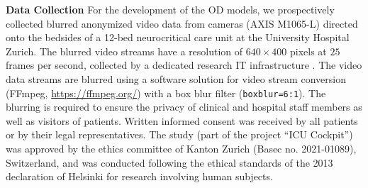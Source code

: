 \documentclass[conference]{IEEEtran}
\begin{document}
\noindent\textbf{Data Collection}
\label{sssec:ContextDataCollection}
For the development of the OD models, we prospectively collected blurred anonymized video data from cameras (AXIS M1065-L) directed onto the bedsides of a 12-bed neurocritical care unit at the University Hospital Zurich.
The blurred video streams have a resolution of $640 \times 400$ pixels at $25$ frames per second, collected by a dedicated research IT infrastructure \cite{Boss2022}.
The video data streams are blurred using a software solution for video stream conversion (FFmpeg, \url{https://ffmpeg.org/}) with a box blur filter ({\small\texttt{boxblur=6:1}}).
The blurring is required to ensure the privacy of clinical and hospital staff members as well as visitors of patients.
Written informed consent was received by all patients or by their legal representatives.
The study (part of the project ``ICU Cockpit'') was approved by the ethics committee of Kanton Zurich (Basec no. 2021-01089), Switzerland, and was conducted following the ethical standards of the 2013 declaration of Helsinki for research involving human subjects.
\end{document}
